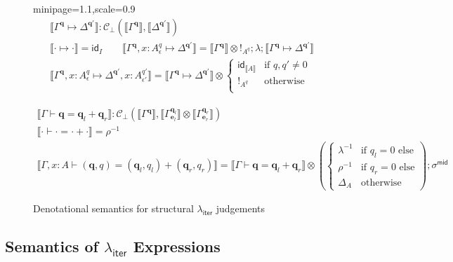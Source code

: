 \documentclass[acmsmall,screen,anonymous,review]{acmart}
\newcommand{\mc}[1]{\ensuremath{\mathcal{#1}}}
\newcommand{\mb}[1]{\ensuremath{\mathbf{#1}}}
\newcommand{\ms}[1]{\ensuremath{\mathsf{#1}}}
\newcommand{\qsp}[4]{#1 \vdash #2 = #3 + #4}
\newcommand{\cwk}[2]{#1 \mapsto #2}
\newcommand{\dnt}[1]{\llbracket{#1}\rrbracket}
\newcommand{\tmor}[1]{{!}_{#1}}
\newcommand{\dmor}[1]{{\Delta}_{#1}}
\newcommand{\subiterexp}{\texorpdfstring{\(\lambda_{\ms{iter}}\)}{lambda-iter}}
\begin{document}
\begin{figure}
  \begin{adjustbox}{minipage=1.1\textwidth,scale=0.9}
  \begin{gather*}
    \boxed{\dnt{\cwk{\Gamma^{\mb{q}}}{\Delta^{\mb{q}'}}} 
      : \mc{C}_\bot(\dnt{\Gamma^{\mb{q}}}, \dnt{\Delta^{\mb{q}'}})} \\
    \dnt{\cwk{\cdot}{\cdot}} = \ms{id}_I \qquad
    \dnt{\cwk{\Gamma^{\mb{q}}, x : A^q_\epsilon}{\Delta^{\mb{q}'}}}
      = \dnt{\Gamma^{\mb{q}}} \otimes \tmor{A^q}
      ; \lambda
      ; \dnt{\cwk{\Gamma^{\mb{q}}}{\Delta^{\mb{q}'}}} \\
    \dnt{\cwk{\Gamma^{\mb{q}}, x : A^q_\epsilon}
              {\Delta^{\mb{q}'}, x : A^{q'}_{\epsilon'}}}
      = \dnt{\cwk{\Gamma^{\mb{q}}}{\Delta^{\mb{q}'}}} \otimes \begin{cases}
        \ms{id}_{\dnt{A}} & \text{if } q, q' \neq 0 \\
        \tmor{A^q} & \text{otherwise} \\
      \end{cases}
  \end{gather*}

  \begin{gather*}
    \boxed{\dnt{\qsp{\Gamma}{\mb{q}}{\mb{q}_l}{\mb{q}_r}} 
      : \mc{C}_\bot(\dnt{\Gamma^{\mb{q}}}, 
        \dnt{\Gamma^{\mb{q}_l}_{\mb{e}_l}} \otimes \dnt{\Gamma^{\mb{q}_r}_{\mb{e}_r}})} 
    \\
    \dnt{\qsp{\cdot}{\cdot}{\cdot}{\cdot}} = \rho^{-1}
    \\
    \dnt{\qsp{\Gamma, x : A}{(\mb{q}, q)}{(\mb{q}_l, q_l)}{(\mb{q}_r, q_r)}}
    = \dnt{\qsp{\Gamma}{\mb{q}}{\mb{q}_l}{\mb{q}_r}} \otimes
    \left(\begin{cases}
      \lambda^{-1} & \text{if } q_l = 0 \text{ else} \\
      \rho^{-1} & \text{if } q_r = 0 \text{ else} \\
      \dmor{A} & \text{otherwise}
    \end{cases}\right) 
    ; \sigma^{\ms{mid}}
  \end{gather*}
  \end{adjustbox}
  \caption{Denotational semantics for structural \subiterexp{} judgements}
  \Description{}
  \label{fig:struct-sem}
\end{figure}

\subsection{Semantics of \subiterexp{} Expressions}
\end{document}
